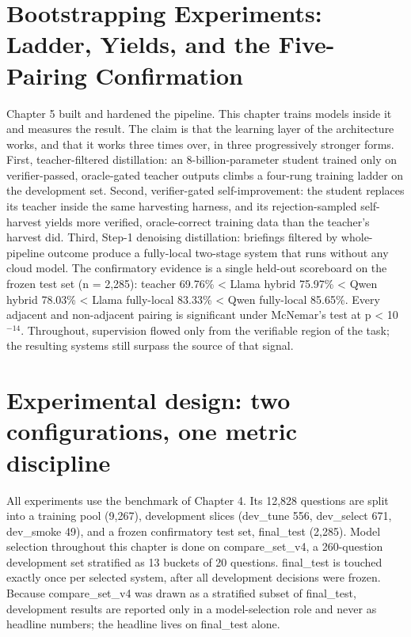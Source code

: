 \section{Bootstrapping Experiments: Ladder, Yields, and the Five-Pairing Confirmation}\label{sec:chapter-6-bootstrapping-experiments-ladd}

Chapter 5 built and hardened the pipeline. This chapter trains models inside it and measures
the result. The claim is that the learning layer of the architecture works, and that it works
three times over, in three progressively stronger forms. First, teacher-filtered distillation:
an 8-billion-parameter student trained only on verifier-passed, oracle-gated teacher outputs
climbs a four-rung training ladder on the development set. Second, verifier-gated
self-improvement: the student replaces its teacher inside the same harvesting harness, and its
rejection-sampled self-harvest yields more verified, oracle-correct training data than the
teacher's harvest did. Third, Step-1 denoising distillation: briefings filtered by
whole-pipeline outcome produce a fully-local two-stage system that runs without any cloud
model. The confirmatory evidence is a single held-out scoreboard on the frozen test set
(n = 2,285): teacher 69.76\% < Llama hybrid 75.97\% < Qwen hybrid 78.03\% < Llama fully-local
83.33\% < Qwen fully-local 85.65\%. Every adjacent and non-adjacent pairing is significant under
McNemar's test at p < 10$^{-14}$. Throughout, supervision flowed only from the verifiable region of
the task; the resulting systems still surpass the source of that signal.

\section{Experimental design: two configurations, one metric discipline}\label{sec:experimental-design-two-configurations-o}

All experiments use the benchmark of Chapter 4. Its 12,828 questions are split into a training
pool (9,267), development slices (dev\_tune 556, dev\_select 671, dev\_smoke 49), and a frozen
confirmatory test set, final\_test (2,285). Model selection throughout this chapter is done on
compare\_set\_v4, a 260-question development set stratified as 13 buckets of 20 questions.
final\_test is touched exactly once per selected system, after all development decisions were
frozen. Because compare\_set\_v4 was drawn as a stratified subset of final\_test, development
results are reported only in a model-selection role and never as headline numbers; the
headline lives on final\_test alone.

